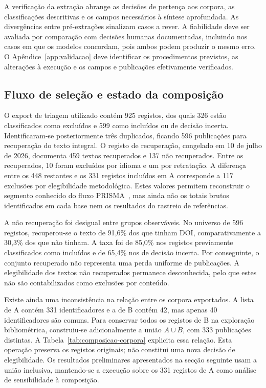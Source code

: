 A verificação da extração abrange as decisões de pertença aos corpora,
as classificações descritivas e os campos necessários à síntese
aprofundada. As divergências entre pré-extrações sinalizam casos a
rever. A fiabilidade deve ser avaliada por comparação com decisões
humanas documentadas, incluindo nos casos em que os modelos concordam,
pois ambos podem produzir o mesmo erro. O Apêndice~\ref{app:validacao}
deve identificar os procedimentos previstos, as alterações à execução
e os campos e publicações efetivamente verificados.

\subsection{Fluxo de seleção e estado da composição}

O export de triagem utilizado contém 925 registos, dos quais 326 estão
classificados como excluídos e 599 como incluídos ou de decisão incerta.
Identificaram-se posteriormente três duplicados, ficando 596 publicações
para recuperação do texto integral. O registo de recuperação, congelado
em 10 de julho de 2026, documenta 459 textos recuperados e 137 não
recuperados. Entre os recuperados, 10 foram excluídos por idioma e um
por retratação. A diferença entre os 448 restantes e os 331 registos
incluídos em A corresponde a 117 exclusões por elegibilidade metodológica.
Estes valores permitem reconstruir o segmento conhecido do fluxo
PRISMA~\cite{Page2021PRISMA}, mas ainda não os totais brutos identificados
em cada base nem os resultados do rastreio de referências.

A não recuperação foi desigual entre grupos observáveis. No universo
de 596 registos, recuperou-se o texto de 91,6\% dos que tinham DOI,
comparativamente a 30,3\% dos que não tinham. A taxa foi de 85,0\% nos
registos previamente classificados como incluídos e de 65,4\% nos de
decisão incerta. Por conseguinte, o conjunto recuperado não representa
uma perda uniforme de publicações. A elegibilidade dos textos não
recuperados permanece desconhecida, pelo que estes não são contabilizados
como exclusões por conteúdo.

Existe ainda uma inconsistência na relação entre os corpora exportados.
A lista de A contém 331 identificadores e a de B contém 42, mas apenas
40 identificadores são comuns. Para conservar todos os registos de B
na exploração bibliométrica, construiu-se adicionalmente a união
$A\cup B$, com 333 publicações distintas. A Tabela~\ref{tab:composicao-corpora}
explicita essa relação. Esta operação preserva os registos originais;
não constitui uma nova decisão de elegibilidade. Os resultados
preliminares apresentados na secção seguinte usam a união inclusiva,
mantendo-se a execução sobre os 331 registos de A como análise de
sensibilidade à composição.

